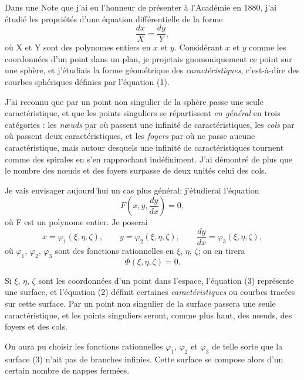 \documentclass[11pt]{article}
\begin{document}
Dans une Note que j’ai eu l’honneur de présenter à l’Académie en 1880, j’ai étudié les propriétés d’une équation différentielle de la forme
\begin{equation}\tag{1}
\frac{dx}{X}=\frac{dy}{Y},
\end{equation}
où X et Y sont des polynomes entiers en $x$ et $y$. Considérant $x$ et $y$ comme les coordonnées d’un point dans un plan, je projetais gnomoniquement ce point sur une sphère, et j’étudiais la forme géométrique des \emph{caractéristiques}, c’est-à-dire des courbes sphériques définies par l’équation (1).

J’ai reconnu que par un point non singulier de la sphère passe une seule caractéristique, et que les points singuliers se répartissent \emph{en général} en trois catégories : les \emph{nœuds} par où passent une infinité de caractéristiques, les \emph{cols} par où passent deux caractéristiques, et les \emph{foyers} par où ne passe aucune caractéristique, mais autour desquels une infinité de caractéristiques tournent comme des spirales en s’en rapprochant indéfiniment. J’ai démontré de plus que le nombre des nœuds et des foyers surpasse de deux unités celui des cols.

Je vais envisager aujourd’hui un cas plus général; j’étudierai l’équation
\begin{equation}\tag{2}
F\left(x,y,\frac{dy}{dx}\right)=0,
\end{equation}
où F est un polynome entier. Je poserai
\[
x=\varphi_1(\xi,\eta,\zeta),\qquad
 y=\varphi_2(\xi,\eta,\zeta),\qquad
\frac{dy}{dx}=\varphi_3(\xi,\eta,\zeta),
\]
où $\varphi_1$, $\varphi_2$, $\varphi_3$ sont des fonctions rationnelles en $\xi$, $\eta$, $\zeta$; on en tirera
\begin{equation}\tag{3}
\Phi(\xi,\eta,\zeta)=0.
\end{equation}

Si $\xi$, $\eta$, $\zeta$ sont les coordonnées d’un point dans l’espace, l’équation (3) représente une surface, et l’équation (2) définit certaines \emph{caractéristiques} ou courbes tracées sur cette surface. Par un point non singulier de la surface passera une seule caractéristique, et les points singuliers seront, comme plus haut, des nœuds, des foyers et des cols.

On aura pu choisir les fonctions rationnelles $\varphi_1$, $\varphi_2$ et $\varphi_3$ de telle sorte que la surface (3) n’ait pas de branches infinies. Cette surface se compose alors d’un certain nombre de nappes fermées.
\end{document}
